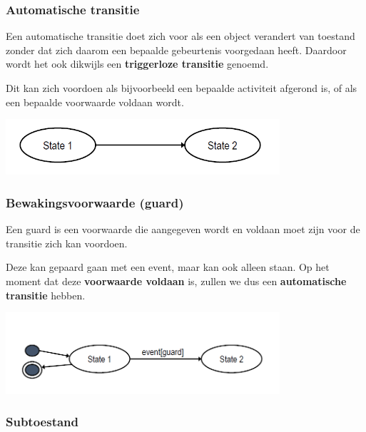 \subsubsection{Automatische transitie}

Een automatische transitie doet zich voor als een object verandert van toestand zonder dat zich daarom een bepaalde gebeurtenis voorgedaan heeft. Daardoor wordt het ook dikwijls een \textbf{triggerloze transitie} genoemd.

Dit kan zich voordoen als bijvoorbeeld een bepaalde activiteit afgerond is, of als een bepaalde voorwaarde voldaan wordt.


\begin{center}
\includegraphics[width=4in]{img/state5}%
\end{center}

\subsubsection{Bewakingsvoorwaarde (guard)}

Een guard is een voorwaarde die aangegeven wordt en voldaan moet zijn voor de transitie zich kan voordoen. 

Deze kan gepaard gaan met een event, maar kan ook alleen staan. Op het moment dat deze \textbf{voorwaarde voldaan} is, zullen we dus een \textbf{automatische transitie} hebben.


\begin{center}
\includegraphics[width=4in]{img/state6}%
\end{center}

\subsubsection{Subtoestand}

